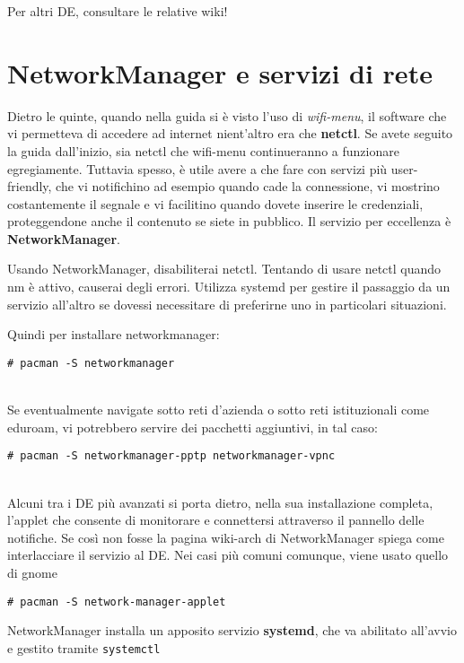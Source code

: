 \documentclass[twoside,italian]{book}
\newcommand{\nlinea}{
	\leavevmode
	\\
}
\newcommand{\centcode}[1]{
	
	\definecolor{centcode}{rgb}{0.5,0.1,0.1}
	
	\begin{center}
	 	\texttt{\textcolor{centcode}{#1}}
	\end{center}
	
	
}
\newcommand{\code}[1]{
	\texttt{\textcolor{code}{#1}}
}
\begin{document}
			Per altri DE, consultare le relative wiki!
			
		\section{NetworkManager e servizi di rete}
			Dietro le quinte, quando nella guida si è visto l'uso di \textit{wifi-menu}, il software che vi permetteva di accedere ad internet nient'altro era che \textbf{netctl}. Se avete seguito la guida dall'inizio, sia netctl che wifi-menu continueranno a funzionare egregiamente. 
			Tuttavia spesso, è utile avere a che fare con servizi più user-friendly, che vi notifichino ad esempio quando cade la connessione, vi mostrino costantemente il segnale e vi facilitino quando dovete inserire le credenziali, proteggendone anche il contenuto se siete in pubblico.
			Il servizio per eccellenza è \textbf{NetworkManager}.
			
			\begin{tcolorbox}[floatplacement=b,width=\textwidth,colback={blue},title={NOTA BENE:},colbacktitle=gray,coltitle=white,colupper=white]
				Usando NetworkManager, disabiliterai netctl. Tentando di usare netctl quando nm è attivo, causerai degli errori. Utilizza systemd per gestire il passaggio da un servizio all'altro se dovessi necessitare di preferirne uno in particolari situazioni.
			\end{tcolorbox}
		
			Quindi per installare networkmanager: \centcode{\# pacman -S networkmanager}
			\nlinea
			Se eventualmente navigate sotto reti d'azienda o sotto reti istituzionali come eduroam, vi potrebbero servire dei pacchetti aggiuntivi, in tal caso:
			\centcode{\# pacman -S networkmanager-pptp networkmanager-vpnc}
			\nlinea
			
			Alcuni tra i DE più avanzati si porta dietro, nella sua installazione completa, l'applet che consente di monitorare e connettersi attraverso il pannello delle notifiche. Se così non fosse la pagina wiki-arch di NetworkManager spiega come interlacciare il servizio al DE.
			Nei casi più comuni comunque, viene usato quello di gnome \centcode{\# pacman -S network-manager-applet}
			
			NetworkManager installa un apposito servizio \textbf{systemd}, che va abilitato all'avvio e gestito tramite \code{systemctl}
			
\end{document}
